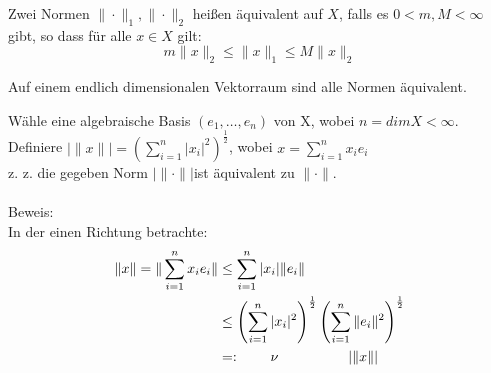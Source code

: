 \begin{definition}
	Zwei Normen $\| \cdot \|_{1}, \| \cdot \|_{2}$ hei{\ss}en äquivalent auf $X$, falls es $0 < m, M < \infty$ gibt, so dass für alle $ x \in X$ gilt:
	\[ m \| x \|_{2} \leq \| x \|_{1} \leq M \| x \|_{2} \]
\end{definition}
 
\begin{satz}
	Auf einem endlich dimensionalen Vektorraum sind alle Normen äquivalent.
\end{satz}
\begin{beweis}
	Wähle eine algebraische Basis $(e_{1}, \dotsc, e_{n})$ von X, wobei $ n = dim X < \infty$. \\
	Definiere $|\|x\|| = \left(\sum_{i = 1}^{n} |x_{i}|^2\right)^{\frac{1}{2}}$, wobei $x = \sum_{i = 1}^{n} x_{i} e_{i}$ \\
	
	z. z. die gegeben Norm $|\| \cdot \||$ist äquivalent zu $\| \cdot \|$. \\ \\
	Beweis: \\
	In der einen Richtung betrachte: 
	\begin{align*}
		\| x \| = \| \sum_{i = 1}^{n} x_{i} e_{i} \| & \leq \sum_{i = 1}^{n} |x_{i}| \|  e_{i} \| \\ 
													& \leq \left( \sum_{i = 1}^{n} |x_{i}|^{2} \right)^\frac{1}{2}  \left( \sum_{i = 1}^{n} \| e_{i} \|^{2} \right)^\frac{1}{2} \\
													& =: \hspace{0.75cm} \nu \hspace{1.75cm} |\| x \||		
	\end{align*}
	

\end{beweis}
